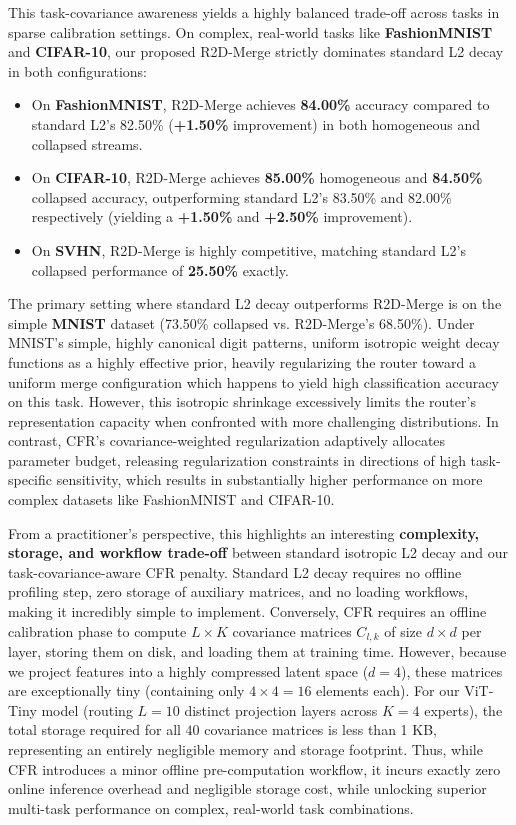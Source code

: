 This task-covariance awareness yields a highly balanced trade-off across tasks in sparse calibration settings. On complex, real-world tasks like \textbf{FashionMNIST} and \textbf{CIFAR-10}, our proposed R2D-Merge strictly dominates standard L2 decay in both configurations:
\begin{itemize}
    \item On \textbf{FashionMNIST}, R2D-Merge achieves \textbf{84.00\%} accuracy compared to standard L2's 82.50\% (\textbf{+1.50\%} improvement) in both homogeneous and collapsed streams.
    \item On \textbf{CIFAR-10}, R2D-Merge achieves \textbf{85.00\%} homogeneous and \textbf{84.50\%} collapsed accuracy, outperforming standard L2's 83.50\% and 82.00\% respectively (yielding a \textbf{+1.50\%} and \textbf{+2.50\%} improvement).
    \item On \textbf{SVHN}, R2D-Merge is highly competitive, matching standard L2's collapsed performance of \textbf{25.50\%} exactly.
\end{itemize}
The primary setting where standard L2 decay outperforms R2D-Merge is on the simple \textbf{MNIST} dataset (73.50\% collapsed vs. R2D-Merge's 68.50\%). Under MNIST's simple, highly canonical digit patterns, uniform isotropic weight decay functions as a highly effective prior, heavily regularizing the router toward a uniform merge configuration which happens to yield high classification accuracy on this task. However, this isotropic shrinkage excessively limits the router's representation capacity when confronted with more challenging distributions. In contrast, CFR's covariance-weighted regularization adaptively allocates parameter budget, releasing regularization constraints in directions of high task-specific sensitivity, which results in substantially higher performance on more complex datasets like FashionMNIST and CIFAR-10.

From a practitioner's perspective, this highlights an interesting \textbf{complexity, storage, and workflow trade-off} between standard isotropic L2 decay and our task-covariance-aware CFR penalty. Standard L2 decay requires no offline profiling step, zero storage of auxiliary matrices, and no loading workflows, making it incredibly simple to implement. Conversely, CFR requires an offline calibration phase to compute $L \times K$ covariance matrices $C_{l,k}$ of size $d \times d$ per layer, storing them on disk, and loading them at training time. 
However, because we project features into a highly compressed latent space ($d=4$), these matrices are exceptionally tiny (containing only $4 \times 4 = 16$ elements each). For our ViT-Tiny model (routing $L=10$ distinct projection layers across $K=4$ experts), the total storage required for all $40$ covariance matrices is less than 1 KB, representing an entirely negligible memory and storage footprint. Thus, while CFR introduces a minor offline pre-computation workflow, it incurs exactly zero online inference overhead and negligible storage cost, while unlocking superior multi-task performance on complex, real-world task combinations.

